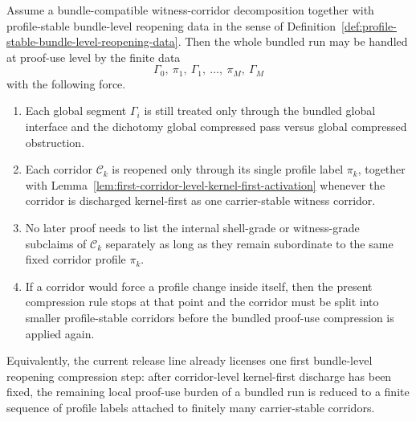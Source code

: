 \begin{proposition}
\label{prop:first-bundle-level-reopening-compression-principle}
Assume a bundle-compatible witness-corridor decomposition together with profile-stable bundle-level reopening data in the sense of Definition~\ref{def:profile-stable-bundle-level-reopening-data}. Then the whole bundled run may be handled at proof-use level by the finite data
\[
\Gamma_0,\ \pi_1,\ \Gamma_1,\ \ldots,\ \pi_M,\ \Gamma_M
\]
with the following force.
\begin{enumerate}[leftmargin=2em,label=(\roman*)]
\item Each global segment $\Gamma_i$ is still treated only through the bundled global interface and the dichotomy global compressed pass versus global compressed obstruction.
\item Each corridor $\mathcal C_k$ is reopened only through its single profile label $\pi_k$, together with Lemma~\ref{lem:first-corridor-level-kernel-first-activation} whenever the corridor is discharged kernel-first as one carrier-stable witness corridor.
\item No later proof needs to list the internal shell-grade or witness-grade subclaims of $\mathcal C_k$ separately as long as they remain subordinate to the same fixed corridor profile $\pi_k$.
\item If a corridor would force a profile change inside itself, then the present compression rule stops at that point and the corridor must be split into smaller profile-stable corridors before the bundled proof-use compression is applied again.
\end{enumerate}
Equivalently, the current release line already licenses one first bundle-level reopening compression step: after corridor-level kernel-first discharge has been fixed, the remaining local proof-use burden of a bundled run is reduced to a finite sequence of profile labels attached to finitely many carrier-stable corridors.
\end{proposition}


